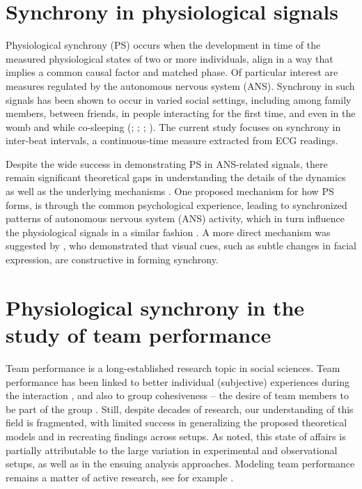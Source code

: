 \documentclass[a4paper, 11pt]{report}      %
\begin{document}
\section{Synchrony in physiological signals}
Physiological synchrony (PS) occurs when the development in time of the measured physiological states of two or more individuals, align in a way that implies a common causal factor and matched phase. Of particular interest are measures regulated by the autonomous nervous system (ANS). Synchrony in such signals has been shown to occur in varied social settings, including among family members, between friends, in people interacting for the first time, and even in the womb and while co-sleeping (\cite{palumbo2017interpersonal}; \cite{jar202physiological}; \cite{ivanov2009maternal}; \cite{yoon2019human}). The current study focuses on synchrony in  inter-beat intervals, a continuous-time measure extracted from ECG readings. 

Despite the wide success in demonstrating PS in ANS-related signals,  there remain significant theoretical gaps in understanding the details of the dynamics as well as the underlying mechanisms  \citep{jar202physiological}. 
One proposed mechanism for how PS forms, is through the common psychological experience, leading to synchronized patterns of autonomous nervous system (ANS) activity, which in turn influence the physiological signals in a similar fashion \citep{palumbo2017interpersonal}. A more direct mechanism was suggested by \citet{behrens2020physiological}, who 
demonstrated that visual cues, such as subtle changes in facial expression, are constructive in forming synchrony. 

\section{Physiological synchrony in the study of team performance}
Team performance is a long-established research topic in social sciences. Team performance has been linked to better individual (subjective) experiences during the interaction \citep{lodahl1961psychometric}, and also to group cohesiveness -- the desire of team members to be part of the group \citep{cartwright1968nature}. Still, despite decades of research, our understanding of this field is fragmented, with limited success in generalizing the proposed theoretical models and in recreating findings across setups. As  \citet{beal2003cohesion} noted, this state of affairs is partially attributable to the large variation in experimental and observational setups, as well as in the ensuing analysis approaches. Modeling team performance remains a matter of active research, see for example \citet{collins2019explorations}.
\end{document}
